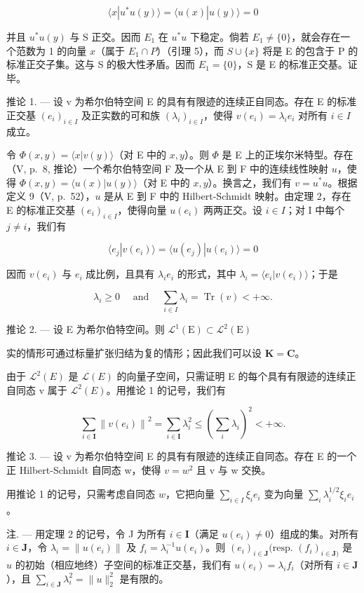 \[
\langle x | u ^ {*} u (y) \rangle = \langle u (x) | u (y) \rangle = 0
\]

并且 \(u^{*}u(y)\) 与 S 正交。因而 \(E_{1}\) 在 \(u^{*}u\) 下稳定。倘若 \(E_{1} \neq \{0\}\)，就会存在一个范数为 1 的向量 \(x\)（属于 \(E_{1} \cap P\)）（引理 5），而 \(S \cup \{x\}\) 将是 E 的包含于 P 的标准正交子集。这与 S 的极大性矛盾。因而 \(E_{1} = \{0\}\)，S 是 E 的标准正交基。证毕。

推论 1. --- 设 v 为希尔伯特空间 E 的具有有限迹的连续正自同态。存在 E 的标准正交基 \((e_{i})_{i\in I}\) 及正实数的可和族 \((\lambda_{i})_{i\in I}\)，使得 \(v(e_{i}) = \lambda_{i}e_{i}\) 对所有 \(i \in I\) 成立。

令 \(\Phi(x, y) = \langle x | v(y) \rangle\)（对 E 中的 \(x, y\)）。则 \(\Phi\) 是 E 上的正埃尔米特型。存在（V, p.~8, 推论）一个希尔伯特空间 F 及一个从 E 到 F 中的连续线性映射 \(u\)，使得 \(\Phi(x, y) = \langle u(x) | u(y) \rangle\)（对 E 中的 \(x, y\)）。换言之，我们有 \(v = u^{*}u\)。根据定义 9（V, p.~52），\(u\) 是从 E 到 F 中的 Hilbert-Schmidt 映射。由定理 2，存在 E 的标准正交基 \((e_{i})_{i \in I}\)，使得向量 \(u(e_{i})\) 两两正交。设 \(i \in I\)；对 I 中每个 \(j \neq i\)，我们有

\[
\langle e _ {j} | v (e _ {i}) \rangle = \langle u (e _ {j}) | u (e _ {i}) \rangle = 0
\]

因而 \(v(e_{i})\) 与 \(e_{i}\) 成比例，且具有 \(\lambda_{i}e_{i}\) 的形式，其中 \(\lambda_{i}=\langle e_{i}|v(e_{i})\rangle\)；于是

\[
\lambda_ {i} \geqslant 0 \quad \text { and } \quad \sum_ {i \in I} \lambda_ {i} = \operatorname{Tr} (v) <   + \infty .
\]

推论 2. --- 设 E 为希尔伯特空间。则 \(\mathcal{L}^{1}(\mathrm{E})\subset \mathcal{L}^{2}(\mathrm{E})\)

实的情形可通过标量扩张归结为复的情形；因此我们可以设 \(\mathbf{K} = \mathbf{C}\)。

由于 \(\mathcal{L}^{2}(E)\) 是 \(\mathcal{L}(E)\) 的向量子空间，只需证明 E 的每个具有有限迹的连续正自同态 v 属于 \(\mathcal{L}^{2}(E)\)。用推论 1 的记号，我们有

\[
\sum_ {i \in \mathbf {I}} \left\| v (e _ {i}) \right\| ^ {2} = \sum_ {i \in \mathbf {I}} \lambda_ {i} ^ {2} \leqslant (\sum_ {i} \lambda_ {i}) ^ {2} <   + \infty .
\]

推论 3. --- 设 v 为希尔伯特空间 E 的具有有限迹的连续正自同态。存在 E 的一个正 Hilbert-Schmidt 自同态 w，使得 \(v = w^{2}\) 且 v 与 w 交换。

用推论 1 的记号，只需考虑自同态 \(w\)，它把向量 \(\sum_{i\in I}\xi_i e_i\) 变为向量 \(\sum_{i}\lambda_i^{1 / 2}\xi_i e_i\)。

注. --- 用定理 2 的记号，令 J 为所有 \(i \in \mathbf{I}\)（满足 \(u(e_i) \neq 0\)）组成的集。对所有 \(i \in \mathbf{J}\)，令 \(\lambda_i = \| u(e_i)\|\) 及 \(f_i = \lambda_i^{-1}u(e_i)\)。则 \((e_i)_{i \in \mathbf{J}}(\text{resp. } (f_i)_{i \in \mathbf{J})}\) 是 \(u\) 的初始（相应地终）子空间的标准正交基，我们有 \(u(e_i) = \lambda_i f_i\)（对所有 \(i \in \mathbf{J}\)），且 \(\sum_{i \in \mathbf{J}} \lambda_i^2 = \| u\|_2^2\) 是有限的。

